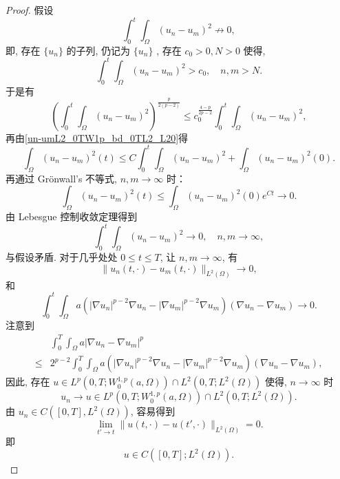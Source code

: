 \documentclass[oneside,longtitle]{LZUthesis}
\numberwithin{equation}{chapter}
\newcommand*\abs[1]{\lvert#1\rvert}
\newcommand*\norm[1]{\lVert#1\rVert}
\newcommand*\Brace[1]{\lbrace#1\rbrace}
\begin{document}
\begin{proof}
	假设
	\begin{equation*}
		\int_0^t\int_{\Omega}\left(u_n-u_m\right)^2 \not\to 0,
	\end{equation*}
	即, 存在 $\Brace{u_n}$ 的子列, 仍记为 $\Brace{u_n}$ , 存在 $c_0 > 0, N > 0$ 使得,
	\begin{equation*}
		\int_0^t\int_{\Omega}\left(u_n-u_m\right)^2 > c_0, \quad n, m > N.
	\end{equation*}
	于是有
	\begin{equation*}
		\left(\int_0^t\int_{\Omega}\left(u_n-u_m\right)^2\right)^{\frac{p}{2(p-2)}}
		\leq c_0^{\frac{4-p}{2p-2}}\int_0^t\int_{\Omega}\left(u_n-u_m\right)^2,
	\end{equation*}
	再由\cref{un-umL2_0TW1p_bd_0TL2_L20}得
	\begin{equation*}
		\int_{\Omega}\left(u_n-u_m\right)^2(t)
		\leq C\int_0^t\int_{\Omega}\left(u_n-u_m\right)^2
		+ \int_{\Omega}\left(u_n-u_m\right)^2(0).
	\end{equation*}
	再通过 Gr\"onwall's 不等式, $n, m \to \infty$ 时：
	\begin{equation*}
		\int_{\Omega}\left( u_n-u_m \right)^2(t)
		\leq \int_{\Omega}\left(u_n-u_m\right)^2(0)e^{Ct} \to 0.
	\end{equation*}
	由 Lebesgue 控制收敛定理得到
	\begin{equation*}
		\int_0^t\int_{\Omega}\left(u_n-u_m\right)^2 \to 0, \quad n, m \to \infty,
	\end{equation*}
	与假设矛盾. 对于几乎处处 $0 \leq t \leq T$, 让 $n,m \to \infty$, 有
	\begin{equation}\label{cauchy_in_L2}
		\norm{u_n(t,\cdot)-u_m(t,\cdot)}_{L^2(\Omega)} \to 0,
	\end{equation}
	和
	\begin{equation}\label{cauchy_in_W1pa}
		\int_{0}^{t}\int_{\Omega}a
		\left(\abs{\nabla u_n}^{p-2}\nabla u_n
		- \abs{\nabla u_m}^{p-2}\nabla u_m\right)
		\left(\nabla u_n - \nabla u_m\right)
		\to 0.
	\end{equation}
	注意到
	\begin{equation*}
		\begin{split}
			& \int_0^T\int_{\Omega}a\abs{\nabla u_n - \nabla u_m}^p\\
			\leq{} & 2^{p-2}\int_{0}^{T}\int_{\Omega}a
			\left(\abs{\nabla u_n}^{p-2}\nabla u_n
			- \abs{\nabla u_m}^{p-2}\nabla u_m\right)
			\left(\nabla u_n - \nabla u_m\right),
		\end{split}
	\end{equation*}
	因此, 存在 $u \in L^p(0, T; W_0^{1,p}(a,\Omega))
		\cap L^2(0, T; L^2(\Omega))$ 使得, $n \to \infty$ 时
	\begin{equation*}
		u_{n} \to u \in L^p(0, T; W_0^{1,p}(a,\Omega))\cap L^2(0, T; L^2(\Omega)).
	\end{equation*}
	由 $u_n \in C([0, T], L^2(\Omega))$, 容易得到
	\begin{equation*}
		\lim_{t' \to t}\norm{u(t,\cdot)-u(t',\cdot)}_{L^2(\Omega)}=0.
	\end{equation*}
	即
	\begin{equation*}
		u \in C([0, T]; L^2(\Omega)).
	\end{equation*}


\end{proof}
\end{document}
